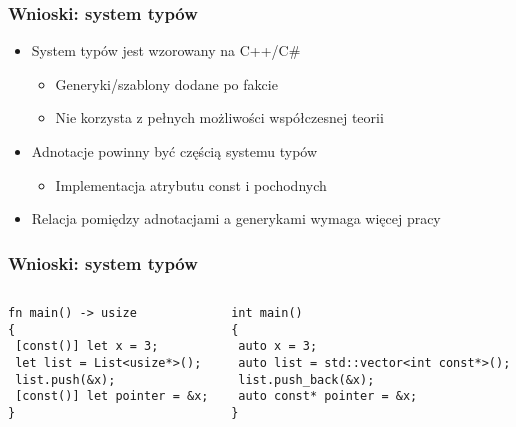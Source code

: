 \begin{frame}
	\frametitle{Wnioski: system typów}

	\begin{itemize}
		\item System typów jest wzorowany na C++/C\#\begin{itemize}
			\item Generyki/szablony dodane po fakcie
			\item Nie korzysta z pełnych możliwości współczesnej teorii
		\end{itemize}
		\item Adnotacje powinny być częścią systemu typów\begin{itemize}
			\item Implementacja atrybutu const i pochodnych
		\end{itemize}
		\item Relacja pomiędzy adnotacjami a generykami wymaga więcej pracy
	\end{itemize}

\end{frame}

\begin{frame}[fragile]
	\frametitle{Wnioski: system typów}

	\begin{columns}
		\begin{column}{0.5\textwidth}
			\begin{lstlisting}[caption={const w C-=-1}]
fn main() -> usize
{
 [const()] let x = 3;
 let list = List<usize*>();
 list.push(&x);
 [const()] let pointer = &x;
}
			\end{lstlisting}
		\end{column}
		\begin{column}{0.5\textwidth}
			\begin{lstlisting}[caption={const w C++}]
int main()
{
 auto x = 3;
 auto list = std::vector<int const*>();
 list.push_back(&x);
 auto const* pointer = &x;
}

			\end{lstlisting}
		\end{column}
	\end{columns}
\end{frame}



